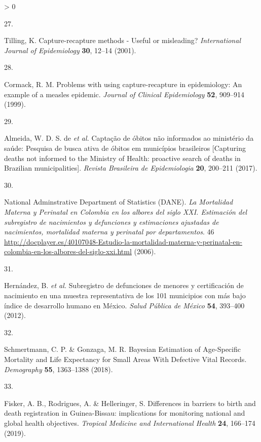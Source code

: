 \documentclass[
]{article}
\newlength{\cslhangindent}
\newlength{\csllabelwidth}
\newenvironment{CSLReferences}[2] %
 {%
  \setlength{\parindent}{0pt}
  \ifodd #1 \everypar{\setlength{\hangindent}{\cslhangindent}}\ignorespaces\fi
  \ifnum #2 > 0
  \setlength{\parskip}{#2\baselineskip}
  \fi
 }%
 {}
\newcommand{\CSLLeftMargin}[1]{\parbox[t]{\csllabelwidth}{#1}}
\newcommand{\CSLRightInline}[1]{\parbox[t]{\linewidth - \csllabelwidth}{#1}\break}
\begin{document}
\begin{CSLReferences}{0}{0}
\leavevmode\hypertarget{ref-Tilling2001}{}%
\CSLLeftMargin{27. }
\CSLRightInline{Tilling, K. {Capture-recapture methods - Useful or misleading?} \emph{International Journal of Epidemiology} \textbf{30}, 12--14 (2001).}

\leavevmode\hypertarget{ref-Cormack1999}{}%
\CSLLeftMargin{28. }
\CSLRightInline{Cormack, R. M. {Problems with using capture-recapture in epidemiology: An example of a measles epidemic}. \emph{Journal of Clinical Epidemiology} \textbf{52}, 909--914 (1999).}

\leavevmode\hypertarget{ref-DeAlmeida2017a}{}%
\CSLLeftMargin{29. }
\CSLRightInline{Almeida, W. D. S. de \emph{et al.} {Capta{ç}{ã}o de {ó}bitos n{ã}o informados ao minist{é}rio da sa{ú}de: Pesquisa de busca ativa de {ó}bitos em munic{í}pios brasileiros {[}Capturing deaths not informed to the Ministry of Health: proactive search of deaths in Brazilian municipalities{]}}. \emph{Revista Brasileira de Epidemiologia} \textbf{20}, 200--211 (2017).}

\leavevmode\hypertarget{ref-NationalAdminstrativeDepartmentofStatisticsDANE2006}{}%
\CSLLeftMargin{30. }
\CSLRightInline{National Adminstrative Department of Statistics (DANE). \emph{{La Mortalidad Materna y Perinatal en Colombia en los albores del siglo XXI. Estimaci{ó}n del subregistro de nacimientos y defunciones y estimaciones ajustadas de nacimientos, mortalidad materna y perinatal por departamentos}}. 46 \url{http://docplayer.es/40107048-Estudio-la-mortalidad-materna-y-perinatal-en-colombia-en-los-albores-del-siglo-xxi.html} (2006).}

\leavevmode\hypertarget{ref-Hernandez2012}{}%
\CSLLeftMargin{31. }
\CSLRightInline{Hernández, B. \emph{et al.} {Subregistro de defunciones de menores y certificaci{ó}n de nacimiento en una muestra representativa de los 101 municipios con m{á}s bajo {í}ndice de desarrollo humano en M{é}xico}. \emph{Salud P{ú}blica de M{é}xico} \textbf{54}, 393--400 (2012).}

\leavevmode\hypertarget{ref-Schmertmann2018a}{}%
\CSLLeftMargin{32. }
\CSLRightInline{Schmertmann, C. P. \& Gonzaga, M. R. {Bayesian Estimation of Age-Specific Mortality and Life Expectancy for Small Areas With Defective Vital Records}. \emph{Demography} \textbf{55}, 1363--1388 (2018).}

\leavevmode\hypertarget{ref-Fisker2019}{}%
\CSLLeftMargin{33. }
\CSLRightInline{Fisker, A. B., Rodrigues, A. \& Helleringer, S. {Differences in barriers to birth and death registration in Guinea-Bissau: implications for monitoring national and global health objectives}. \emph{Tropical Medicine and International Health} \textbf{24}, 166--174 (2019).}


\end{CSLReferences}
\end{document}
